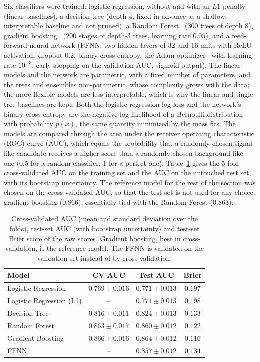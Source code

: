 Six classifiers were trained: logistic regression, without and with an $L1$ penalty (linear baselines), a decision tree (depth 4, fixed in advance as a shallow, interpretable baseline and not pruned), a Random Forest~\cite{breiman_rf} (300 trees of depth 8), gradient boosting~\cite{friedman_gbm} (200 stages of depth-3 trees, learning rate $0.05$), and a feed-forward neural network (FFNN: two hidden layers of 32 and 16 units with ReLU activation, dropout $0.2$, binary cross-entropy, the Adam optimizer~\cite{adam} with learning rate $10^{-3}$, early stopping on the validation AUC, sigmoid output). The linear models and the network are parametric, with a fixed number of parameters, and the trees and ensembles non-parametric, whose complexity grows with the data; the more flexible models are less interpretable, which is why the linear and single-tree baselines are kept. Both the logistic-regression log-loss and the network's binary cross-entropy are the negative log-likelihood of a Bernoulli distribution with probability $p(x)$, the same quantity minimized by the mass fits. The models are compared through the area under the receiver operating characteristic (ROC) curve (AUC), which equals the probability that a randomly chosen signal-like candidate receives a higher score than a randomly chosen background-like one ($0.5$ for a random classifier, $1$ for a perfect one). Table~\ref{tab:ml_models} gives the 5-fold cross-validated AUC on the training set and the AUC on the untouched test set, with its bootstrap uncertainty. The reference model for the rest of the section was chosen on the cross-validated AUC, so that the test set is not used for any choice: gradient boosting ($0.866$), essentially tied with the Random Forest ($0.863$).

\begin{table}[h]
\centering
\begin{tabular}{lccc}
\toprule
Model & CV AUC & Test AUC & Brier \\
\midrule
Logistic Regression       & $0.769 \pm 0.016$ & $0.771 \pm 0.013$ & $0.197$ \\
Logistic Regression (L1)  & --                & $0.771 \pm 0.013$ & $0.198$ \\
Decision Tree             & $0.816 \pm 0.011$ & $0.824 \pm 0.013$ & $0.133$ \\
Random Forest             & $0.863 \pm 0.017$ & $0.860 \pm 0.012$ & $0.122$ \\
Gradient Boosting         & $\mathbf{0.866 \pm 0.016}$ & $0.864 \pm 0.012$ & $0.116$ \\
FFNN                      & --                & $0.857 \pm 0.012$ & $0.134$ \\
\bottomrule
\end{tabular}
\caption{Cross-validated AUC (mean and standard deviation over the folds), test-set AUC (with bootstrap uncertainty) and test-set Brier score of the raw scores. Gradient boosting, best in cross-validation, is the reference model. The FFNN is validated on the validation set instead of by cross-validation.}
\label{tab:ml_models}
\end{table}

